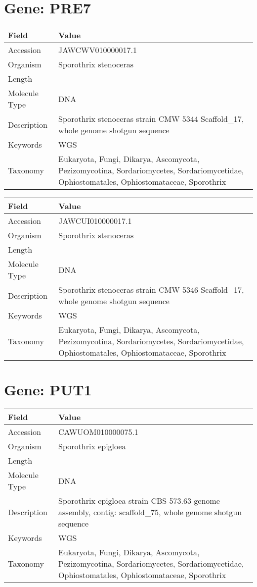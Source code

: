 \documentclass[10pt]{article}
\begin{document}
\section*{Gene: PRE7}
{\footnotesize
\begin{longtable}{>{\raggedright\arraybackslash}p{4.5cm} >{\raggedright\arraybackslash}p{11.5cm}}
\textbf{Field} & \textbf{Value} \\
\hline
Accession & JAWCWV010000017.1 \\
Organism & Sporothrix stenoceras \\
Length & 653204 \\
Molecule Type & DNA \\
Description & Sporothrix stenoceras strain CMW 5344 Scaffold\_17, whole genome shotgun sequence \\
Keywords & WGS \\
Taxonomy & Eukaryota, Fungi, Dikarya, Ascomycota, Pezizomycotina, Sordariomycetes, Sordariomycetidae, Ophiostomatales, Ophiostomataceae, Sporothrix \\
\end{longtable}
}

{\footnotesize
\begin{longtable}{>{\raggedright\arraybackslash}p{4.5cm} >{\raggedright\arraybackslash}p{11.5cm}}
\textbf{Field} & \textbf{Value} \\
\hline
Accession & JAWCUI010000017.1 \\
Organism & Sporothrix stenoceras \\
Length & 649007 \\
Molecule Type & DNA \\
Description & Sporothrix stenoceras strain CMW 5346 Scaffold\_17, whole genome shotgun sequence \\
Keywords & WGS \\
Taxonomy & Eukaryota, Fungi, Dikarya, Ascomycota, Pezizomycotina, Sordariomycetes, Sordariomycetidae, Ophiostomatales, Ophiostomataceae, Sporothrix \\
\end{longtable}
}


\section*{Gene: PUT1}
{\footnotesize
\begin{longtable}{>{\raggedright\arraybackslash}p{4.5cm} >{\raggedright\arraybackslash}p{11.5cm}}
\textbf{Field} & \textbf{Value} \\
\hline
Accession & CAWUOM010000075.1 \\
Organism & Sporothrix epigloea \\
Length & 114238 \\
Molecule Type & DNA \\
Description & Sporothrix epigloea strain CBS 573.63 genome assembly, contig: scaffold\_75, whole genome shotgun sequence \\
Keywords & WGS \\
Taxonomy & Eukaryota, Fungi, Dikarya, Ascomycota, Pezizomycotina, Sordariomycetes, Sordariomycetidae, Ophiostomatales, Ophiostomataceae, Sporothrix \\
\end{longtable}
}
\end{document}
